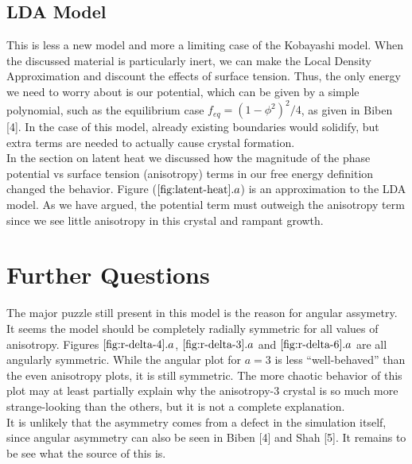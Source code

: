 \documentclass[10pt]{article} %
\begin{document}
\subsection{LDA Model}
This is less a new model and more a limiting case of the Kobayashi model. When the discussed material is particularly inert, we can make the Local Density Approximation and discount the effects of surface tension. Thus, the only energy we need to worry about is our potential, which can be given by a simple polynomial, such as the equilibrium case $f_{eq} = (1-\phi^2)^2/4$, as given in Biben [4]. In the case of this model, already existing boundaries would solidify, but extra terms are needed to actually cause crystal formation.\\

In the section on latent heat we discussed how the magnitude of the phase potential vs surface tension (anisotropy) terms in our free energy definition changed the behavior. Figure ($\ref{fig:latent-heat}.a$) is an approximation to the LDA model. As we have argued, the potential term must outweigh the anisotropy term since we see little anisotropy in this crystal and rampant growth.\\

\section{Further Questions}
The major puzzle still present in this model is the reason for angular assymetry. It seems the model should be completely radially symmetric for all values of anisotropy. Figures $\ref{fig:r-delta-4}.a$, $\ref{fig:r-delta-3}.a$ and $\ref{fig:r-delta-6}.a$ are all angularly symmetric. While the angular plot for $a=3$ is less ``well-behaved'' than the even anisotropy plots, it is still symmetric. The more chaotic behavior of this plot may at least partially explain why the anisotropy-3 crystal is so much more strange-looking than the others, but it is not a complete explanation.\\

It is unlikely that the asymmetry comes from a defect in the simulation itself, since angular asymmetry can also be seen in Biben [4] and Shah [5]. It remains to be see what the source of this is.\\
\end{document}
